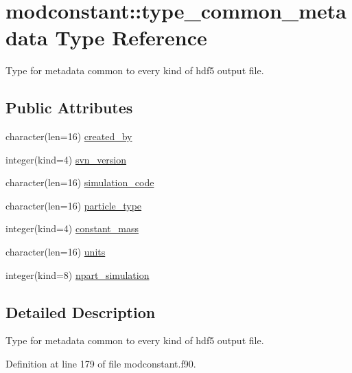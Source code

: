 \hypertarget{structmodconstant_1_1type__common__metadata}{\section{modconstant\-:\-:type\-\_\-common\-\_\-metadata Type Reference}
\label{structmodconstant_1_1type__common__metadata}
}


Type for metadata common to every kind of hdf5 output file.  


\subsection*{Public Attributes}
\begin{DoxyCompactItemize}
\item 
character(len=16) \hyperlink{structmodconstant_1_1type__common__metadata_af9a961d4c57cd62a7733a153caa0b322}{created\-\_\-by}
\item 
integer(kind=4) \hyperlink{structmodconstant_1_1type__common__metadata_a3391b8fc33aca9c2335c91ddfd1ab62c}{svn\-\_\-version}
\item 
character(len=16) \hyperlink{structmodconstant_1_1type__common__metadata_ac2742a0b43801244b3e434212af677c8}{simulation\-\_\-code}
\item 
character(len=16) \hyperlink{structmodconstant_1_1type__common__metadata_a3a269529664935329ee2645f0b0378ba}{particle\-\_\-type}
\item 
integer(kind=4) \hyperlink{structmodconstant_1_1type__common__metadata_acfe577e21098bca8ccba3ce6f3072790}{constant\-\_\-mass}
\item 
character(len=16) \hyperlink{structmodconstant_1_1type__common__metadata_ad81415369b15fcdd7537927b1a95dacf}{units}
\item 
integer(kind=8) \hyperlink{structmodconstant_1_1type__common__metadata_aa54480d2f806e2a54479a34b80246888}{npart\-\_\-simulation}
\end{DoxyCompactItemize}


\subsection{Detailed Description}
Type for metadata common to every kind of hdf5 output file. 

Definition at line 179 of file modconstant.\-f90.



